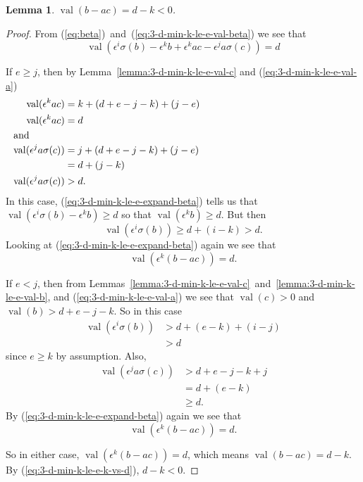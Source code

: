 \documentclass{amsart}
\newtheorem{lemma}{Lemma}[subsection]
\theoremstyle{definition}
\def\e{\epsilon}
\def\val{\mathop{\mathrm{val}}}
\def\s{\sigma}
\begin{document}
  \begin{lemma}
    \label{lemma:3-d-min-k-le-e-val-b-m-ac}
    $\val(b-ac) = d - k < 0$.
  \end{lemma}
  \begin{proof}
    From (\ref{eq:beta})~and~(\ref{eq:3-d-min-k-le-e-val-beta}) we see that
    \begin{equation}
      \label{eq:3-d-min-k-le-e-expand-beta}
      \val(\e^i\s(b) - \e^k b + \e^k ac - \e^j a\s(c)) = d
    \end{equation}
    
    If $e \ge j$, then by Lemma~\ref{lemma:3-d-min-k-le-e-val-c} and
    (\ref{eq:3-d-min-k-le-e-val-a})
    \begin{align*}
      \val(\e^k ac) &= k + (d + e - j - k) + (j - e) \nonumber \\
      \val(\e^k ac) &= d \\
      \noalign{\noindent and}
      \val(\e^j a\s(c)) &= j + (d + e - j - k) + (j - e) \nonumber \\
                        &= d + (j - k) \nonumber \\
      \val(\e^j a\s(c)) &> d.
    \end{align*}
    In this case, (\ref{eq:3-d-min-k-le-e-expand-beta}) tells us that
    $\val(\e^i\s(b) - \e^k b) \ge d$ so that $\val(\e^kb) \ge d$.  But then
    \begin{equation*}
      \val(\e^i\s(b)) \ge d + (i - k) > d.
    \end{equation*}
    Looking at (\ref{eq:3-d-min-k-le-e-expand-beta}) again we see that
    \begin{equation*}
      \val(\e^k(b - ac)) = d.
    \end{equation*}

    If $e < j$, then from
    Lemmas~\ref{lemma:3-d-min-k-le-e-val-c}~and~\ref{lemma:3-d-min-k-le-e-val-b},
    and (\ref{eq:3-d-min-k-le-e-val-a}) we see that $\val(c) > 0$ and $\val(b)
    > d + e - j - k$.  So in this case
    \begin{align*}
      \val(\e^i\s(b)) &> d + (e - k) + (i - j) \\
                      &> d
    \end{align*}
    since $e \ge k$ by assumption.  Also,
    \begin{align*}
      \val(\e^j a \s(c)) &> d + e - j - k  + j \\
                         &= d + (e - k) \\
                         &\ge d.
    \end{align*}
    By (\ref{eq:3-d-min-k-le-e-expand-beta}) again we see that
    \begin{equation*}
      \val(\e^k(b - ac)) = d.
    \end{equation*}

    So in either case, $\val(\e^k(b - ac)) = d$, which means $\val(b-ac) = d -
    k$.  By (\ref{eq:3-d-min-k-le-e-k-vs-d}), $d - k < 0$.
  \end{proof}
\end{document}
